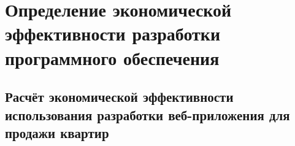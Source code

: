 \newcommand{\byr}{Br}

\section{Определение экономической эффективности разработки программного обеспечения}

\subsection{Расчёт экономической эффективности использования разработки веб-приложения для продажи квартир}
















